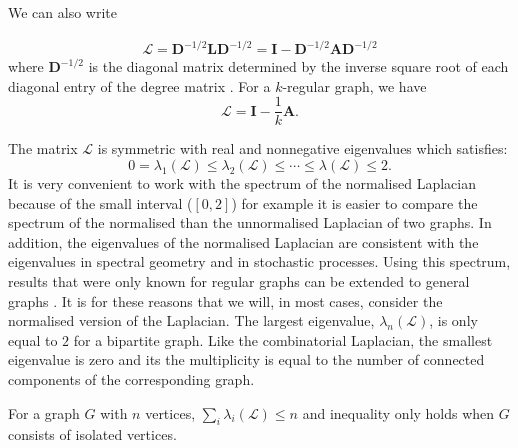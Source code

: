 \documentclass[10pt,a4paper]{article}
\theoremstyle{plain}
\theoremstyle{definition}
\begin{document}
We can also write 

\begin{eqnarray*}
	\mathbf{\mathcal{L}} = \mathbf{D}^{-1/2} \mathbf{L} \mathbf{D}^{-1/2} = \mathbf{I} -\mathbf{D}^{-1/2} \mathbf{A} \mathbf{D}^{-1/2}
\end{eqnarray*}
where $\mathbf{D}^{-1/2}$ is the diagonal matrix determined by the inverse square root of each diagonal entry of the degree matrix \citep{estrada2011structure}. For a $k$-regular graph, we have
\begin{equation}
\mathcal{L} = \mathbf{I}-\frac{1}{k} \mathbf{A}.
\end{equation}

The matrix $\mathcal{L}$ is symmetric with real and nonnegative eigenvalues which satisfies:
\begin{equation*}
0  = \lambda_1(\mathcal{L}) \leq  \lambda_2(\mathcal{L}) \leq \cdots \leq  \lambda(\mathcal{L}) \leq 2.
\end{equation*}
It is very convenient to work with the spectrum of the normalised Laplacian because of the small interval ($[0,2]$) for example it is easier to compare the spectrum of the normalised than the unnormalised Laplacian of two graphs. In addition, the eigenvalues of the normalised Laplacian are consistent with the eigenvalues in spectral geometry and in stochastic processes. Using this spectrum, results that were only known for regular graphs can be extended to general graphs \citep{chung1997spectral}. It is for these reasons that we will, in most cases, consider the normalised version of the Laplacian.
The largest eigenvalue, $\lambda_n(\mathcal{L})$, is only equal to $2$ for a bipartite graph. Like the combinatorial Laplacian, the smallest eigenvalue is zero and its the multiplicity is equal to the number of connected components of the corresponding graph. 

For a graph $G$ with $n$ vertices, $\sum_{i}\lambda_i(\mathcal{L}) \leq n$ and inequality only holds when $G$ consists of isolated vertices.
\end{document}
